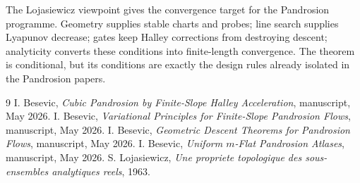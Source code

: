 \documentclass[11pt]{article}
\begin{document}
The Lojasiewicz viewpoint gives the convergence target for the Pandrosion programme. Geometry supplies stable charts and probes; line search supplies Lyapunov decrease; gates keep Halley corrections from destroying descent; analyticity converts these conditions into finite-length convergence. The theorem is conditional, but its conditions are exactly the design rules already isolated in the Pandrosion papers.

\begin{thebibliography}{9}
I. Besevic, \emph{Cubic Pandrosion by Finite-Slope Halley Acceleration}, manuscript, May 2026.
I. Besevic, \emph{Variational Principles for Finite-Slope Pandrosion Flows}, manuscript, May 2026.
I. Besevic, \emph{Geometric Descent Theorems for Pandrosion Flows}, manuscript, May 2026.
I. Besevic, \emph{Uniform \(m\)-Flat Pandrosion Atlases}, manuscript, May 2026.
S. Lojasiewicz, \emph{Une propriete topologique des sous-ensembles analytiques reels}, 1963.
\end{thebibliography}
\end{document}
